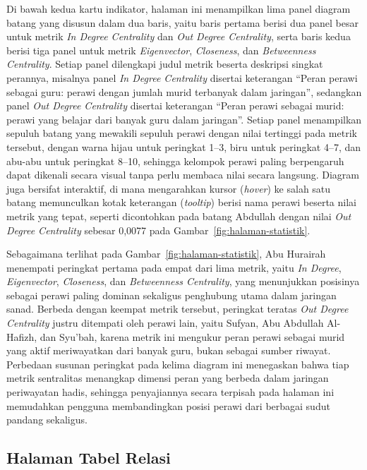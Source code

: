 	Di bawah kedua kartu indikator, halaman ini menampilkan lima panel diagram batang yang disusun dalam dua baris, yaitu baris pertama berisi dua panel besar untuk metrik \textit{In Degree Centrality} dan \textit{Out Degree Centrality}, serta baris kedua berisi tiga panel untuk metrik \textit{Eigenvector}, \textit{Closeness}, dan \textit{Betweenness Centrality}. Setiap panel dilengkapi judul metrik beserta deskripsi singkat perannya, misalnya panel \textit{In Degree Centrality} disertai keterangan ``Peran perawi sebagai guru: perawi dengan jumlah murid terbanyak dalam jaringan'', sedangkan panel \textit{Out Degree Centrality} disertai keterangan ``Peran perawi sebagai murid: perawi yang belajar dari banyak guru dalam jaringan''. Setiap panel menampilkan sepuluh batang yang mewakili sepuluh perawi dengan nilai tertinggi pada metrik tersebut, dengan warna hijau untuk peringkat 1--3, biru untuk peringkat 4--7, dan abu-abu untuk peringkat 8--10, sehingga kelompok perawi paling berpengaruh dapat dikenali secara visual tanpa perlu membaca nilai secara langsung. Diagram juga bersifat interaktif, di mana mengarahkan kursor (\textit{hover}) ke salah satu batang memunculkan kotak keterangan (\textit{tooltip}) berisi nama perawi beserta nilai metrik yang tepat, seperti dicontohkan pada batang Abdullah dengan nilai \textit{Out Degree Centrality} sebesar 0,0077 pada Gambar~\ref{fig:halaman-statistik}.

	Sebagaimana terlihat pada Gambar~\ref{fig:halaman-statistik}, Abu Hurairah menempati peringkat pertama pada empat dari lima metrik, yaitu \textit{In Degree}, \textit{Eigenvector}, \textit{Closeness}, dan \textit{Betweenness Centrality}, yang menunjukkan posisinya sebagai perawi paling dominan sekaligus penghubung utama dalam jaringan sanad. Berbeda dengan keempat metrik tersebut, peringkat teratas \textit{Out Degree Centrality} justru ditempati oleh perawi lain, yaitu Sufyan, Abu Abdullah Al-Hafizh, dan Syu'bah, karena metrik ini mengukur peran perawi sebagai murid yang aktif meriwayatkan dari banyak guru, bukan sebagai sumber riwayat. Perbedaan susunan peringkat pada kelima diagram ini menegaskan bahwa tiap metrik sentralitas menangkap dimensi peran yang berbeda dalam jaringan periwayatan hadis, sehingga penyajiannya secara terpisah pada halaman ini memudahkan pengguna membandingkan posisi perawi dari berbagai sudut pandang sekaligus.

\subsection{Halaman Tabel Relasi}

